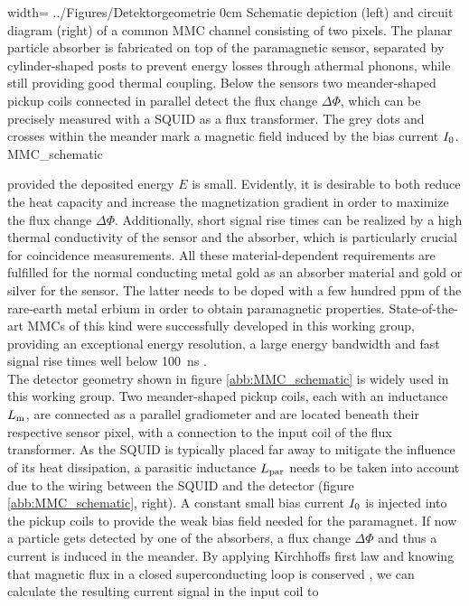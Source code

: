 
{width=\textwidth}
{../Figures/Detektorgeometrie}
{0cm}
{Schematic depiction (left) and circuit diagram (right) of a common MMC channel consisting of two pixels. The planar particle absorber is fabricated on top of the paramagnetic sensor, separated by cylinder-shaped posts to prevent energy losses through athermal phonons, while still providing good thermal coupling. Below the sensors two meander-shaped pickup coils connected in parallel detect the flux change $\Delta\Phi$, which can be precisely measured with a SQUID as a flux transformer. The grey dots and crosses within the meander mark a magnetic field induced by the bias current $I_{\rm 0}$.} 
{MMC_schematic}

provided the deposited energy $E$ is small. Evidently, it is desirable to both reduce the heat capacity and increase the magnetization gradient in order to maximize the flux change $\Delta\Phi$. Additionally, short signal rise times can be realized by a high thermal conductivity of the sensor and the absorber, which is particularly crucial for coincidence measurements. All these material-dependent requirements are fulfilled for the normal conducting metal gold as an absorber material and gold or silver for the sensor. The latter needs to be doped with a few hundred ppm of the rare-earth metal erbium in order to obtain paramagnetic properties. State-of-the-art MMCs of this kind were successfully developed in this working group, providing an exceptional energy resolution, a large energy bandwidth and fast signal rise times well below \qty{100}{\nano\s} \cite{Kempf2018}. \\

The detector geometry shown in figure \ref{abb:MMC_schematic} is widely used in this working group. Two meander-shaped pickup coils, each with an inductance $L_{\rm m}$, are connected as a parallel gradiometer and are located beneath their respective sensor pixel, with a connection to the input coil of the flux transformer. As the SQUID is typically placed far away to mitigate the influence of its heat dissipation, a parasitic inductance $L_{\rm par}$ needs to be taken into account due to the wiring between the SQUID and the detector (figure \ref{abb:MMC_schematic}, right). A constant small bias current $I_{\rm 0}$ is injected into the pickup coils to provide the weak bias field needed for the paramagnet. If now a particle gets detected by one of the absorbers, a flux change $\Delta\Phi$ and thus a current is induced in the meander. By applying Kirchhoffs first law and knowing that magnetic flux in a closed superconducting loop is conserved \cite{}, we can calculate the resulting current signal in the input coil to \cite{}

